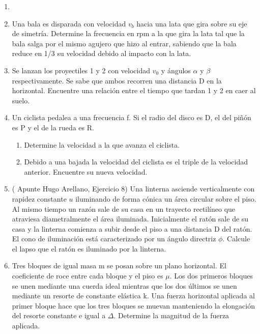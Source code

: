 \documentclass[letterpaper,11pt]{article}
\begin{document}
\vspace{-1cm}
\begin{enumerate}\setlength{\itemsep}{0.4cm}


\item[]

\item Una bala es disparada con velocidad $v_b$ hacia una lata que gira sobre su eje de simetría. Determine la frecuencia en rpm a la que gira la lata tal que la bala salga por el mismo agujero que hizo al entrar, sabiendo que la bala reduce en 1/3 su velocidad debido al impacto con la lata.

\item Se lanzan los proyectiles 1 y 2 con velocidad $v_0$ y ángulos $\alpha$ y $\beta$ respectivamente. Se sabe que ambos recorren una distancia D en la horizontal. Encuentre una relación entre el tiempo que tardan 1 y 2 en caer al suelo.

 \item Un ciclista pedalea a una frecuencia f. Si el radio del disco es D, el del piñón es P y el de la rueda es R.
 \begin{enumerate}
     \item Determine la velocidad a la que avanza el ciclista.
     \item Debido a una bajada la velocidad del ciclista es el triple de la velocidad anterior. Encuentre su nueva velocidad.
 \end{enumerate}
 
\item ( Apunte Hugo Arellano, Ejercicio 8) Una linterna asciende verticalmente con rapidez constante $u$ iluminando de forma cónica un área circular sobre el piso. Al mismo tiempo un razón sale de su casa en un trayecto rectilíneo que atraviesa diametralmente el área iluminada. Inicialmente el ratón sale de su casa y la linterna comienza a subir desde el piso a una distancia D del ratón. El cono de iluminación está caracterizado por un 
ángulo directriz $\phi$. Calcule el lapso que el ratón es iluminado por la linterna.

\item Tres bloques de igual masa m se posan sobre un plano horizontal. El coeficiente de roce entre cada bloque y el piso es $\mu$. Los dos primeros bloques se unen mediante una cuerda ideal mientras que los dos últimos se unen mediante un resorte de constante elástica k. Una fuerza horizontal aplicada al primer bloque hace que los tres bloques se muevan manteniendo la elongación del resorte constante e igual a $\Delta$. Determine la magnitud de la fuerza aplicada.
\end{enumerate}
\end{document}
